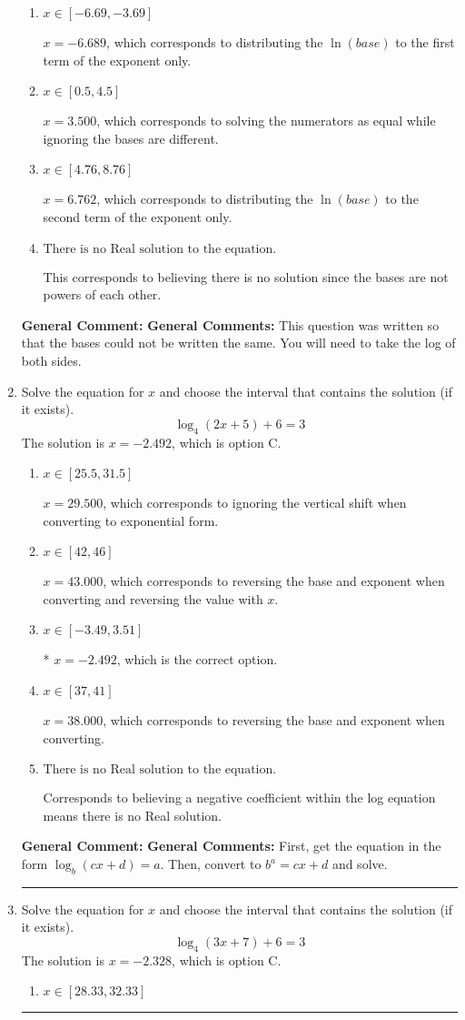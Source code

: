 \documentclass{extbook}[14pt]
\newcommand{\litem}[1]{\item #1

\rule{\textwidth}{0.4pt}}
\begin{document}
\begin{enumerate}
{\begin{enumerate}[label=\Alph*.]
* $x = -12.922$, which is the correct option.
\item \( x \in [-6.69, -3.69] \)

$x = -6.689$, which corresponds to distributing the $\ln(base)$ to the first term of the exponent only.
\item \( x \in [0.5, 4.5] \)

$x = 3.500$, which corresponds to solving the numerators as equal while ignoring the bases are different.
\item \( x \in [4.76, 8.76] \)

$x = 6.762$, which corresponds to distributing the $\ln(base)$ to the second term of the exponent only.
\item \( \text{There is no Real solution to the equation.} \)

This corresponds to believing there is no solution since the bases are not powers of each other.
\end{enumerate}

\textbf{General Comment:} \textbf{General Comments:} This question was written so that the bases could not be written the same. You will need to take the log of both sides.
}
\litem{
Solve the equation for $x$ and choose the interval that contains the solution (if it exists).
\[ \log_{4}{(2x+5)}+6 = 3 \]The solution is \( x = -2.492 \), which is option C.\begin{enumerate}[label=\Alph*.]
\item \( x \in [25.5, 31.5] \)

$x = 29.500$, which corresponds to ignoring the vertical shift when converting to exponential form.
\item \( x \in [42, 46] \)

$x = 43.000$, which corresponds to reversing the base and exponent when converting and reversing the value with $x$.
\item \( x \in [-3.49, 3.51] \)

* $x = -2.492$, which is the correct option.
\item \( x \in [37, 41] \)

$x = 38.000$, which corresponds to reversing the base and exponent when converting.
\item \( \text{There is no Real solution to the equation.} \)

Corresponds to believing a negative coefficient within the log equation means there is no Real solution.
\end{enumerate}

\textbf{General Comment:} \textbf{General Comments:} First, get the equation in the form $\log_b{(cx+d)} = a$. Then, convert to $b^a = cx+d$ and solve.
}
\litem{
Solve the equation for $x$ and choose the interval that contains the solution (if it exists).
\[ \log_{4}{(3x+7)}+6 = 3 \]The solution is \( x = -2.328 \), which is option C.\begin{enumerate}[label=\Alph*.]
\item \( x \in [28.33, 32.33] \)


\end{enumerate}}
\end{enumerate}
\end{document}
